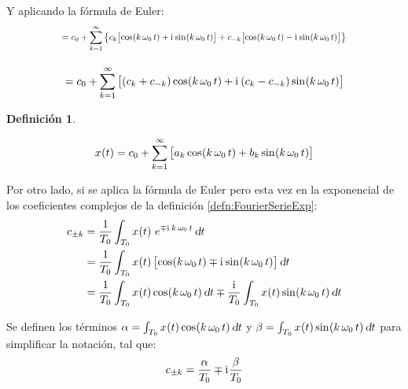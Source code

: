 \documentclass[a5paper,12pt,twoside]{book}
\newtheorem{defn}{{Definición}}[chapter]
\begin{document}
Y aplicando la fórmula de Euler:
\begin{align*}
    &
    \scale{0.80}{
    = c_0 + \sum_{\kth=1}^{\infty} \braces{c_\kth \sqb{\fx[\cos]{\kth \, \omega_0 \, t} + \iu \fx[\sin]{\kth \, \omega_0 \, t}} + c_{-\kth} \sqb{\fx[\cos]{\kth \, \omega_0 \, t} - \iu \fx[\sin]{\kth \, \omega_0 \, t}} }
    }
    \\[1em]
    &= c_0 + \sum_{\kth=1}^{\infty} \sqb{ \bb{c_\kth + c_{-\kth}} \fx[\cos]{\kth \, \omega_0 \, t} + \iu \bb{c_\kth - c_{-\kth}} \fx[\sin]{\kth \, \omega_0 \, t} }
\end{align*}

\begin{mdframed}[style=MyFrame1]
    \begin{defn}
        \label{defn:FourierSerieTrig}
    \end{defn}
    \begin{equation*}
        \fx[x]{t} = c_0 + \sum_{\kth=1}^{\infty} \sqb{a_\kth \fx[\cos]{\kth \, \omega_0 \, t} + b_\kth \fx[\sin]{\kth \, \omega_0 \, t} }
    \end{equation*}
\end{mdframed}

Por otro lado, si se aplica la fórmula de Euler pero esta vez en la exponencial de los coeficientes complejos de la definición \ref{defn:FourierSerieExp}:
\begin{align*}
    c_{\pm\kth} &= \frac{1}{T_0} \int_{T_0} \fx[x]{t} \, e^{\mp \iu \, \kth \, \omega_0 \, t} \, \dif t
    \\
    &= \frac{1}{T_0} \int_{T_0} \fx[x]{t} \sqb{ \fx[\cos]{\kth \, \omega_0 \, t} \mp \iu \fx[\sin]{\kth \, \omega_0 \, t} } \, \dif t
    \\
    &= \frac{1}{T_0} \int_{T_0} \fx[x]{t} \fx[\cos]{\kth \, \omega_0 \, t} \dif t
    \mp \frac{\iu}{T_0} \int_{T_0} \fx[x]{t} \fx[\sin]{\kth \, \omega_0 \, t} \dif t
\end{align*}

Se definen los términos $\alpha = \int_{T_0} \fx[x]{t} \fx[\cos]{\kth \, \omega_0 \, t} \dif t$ y $\beta = \int_{T_0} \fx[x]{t} \fx[\sin]{\kth \, \omega_0 \, t} \dif t$ para simplificar la notación, tal que:
\begin{equation*}
     c_{\pm\kth} = \frac{\alpha}{T_0} \mp \iu \frac{\beta}{T_0}
\end{equation*}
\end{document}
